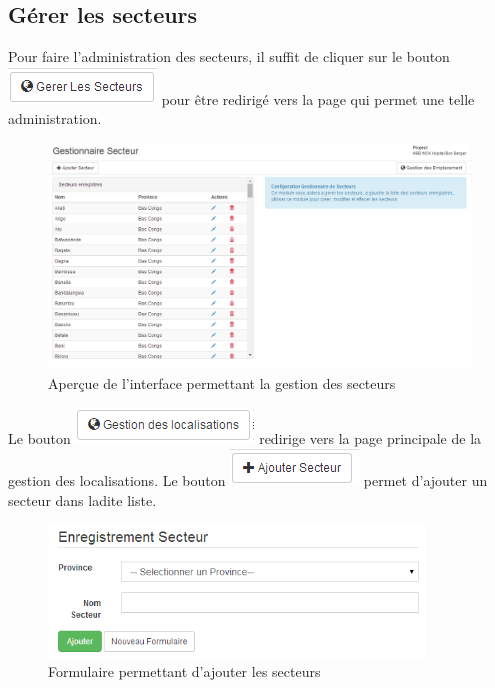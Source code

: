 \documentclass[12pt,a4paper]{report}
\begin{document}
\subsection{Gérer les secteurs}
Pour faire l'administration des secteurs, il suffit de cliquer sur le bouton \includegraphics[scale=0.7]{pic/AdminSecteur.png} pour être redirigé vers la page qui permet une telle administration.

\begin{figure}[h]
\begin{center}
\includegraphics[width=12cm]{pic/FormulaireGestionSecteur.png}
\end{center}
\caption{Aperçue de l'interface permettant la gestion des secteurs}
\label{Aperçue de l'interface permettant la gestion des secteurs}
\end{figure}

Le bouton \includegraphics[scale=0.7]{pic/GestionEmplacement.png} redirige vers la page principale de la gestion des localisations.
Le bouton \includegraphics[scale=0.7]{pic/AddSecteur.png} permet d'ajouter un secteur dans ladite liste.

\begin{figure}[h]
\begin{center}
\includegraphics[width=10cm]{pic/FormAddSecteur.png}
\end{center}
\caption{Formulaire permettant d'ajouter les secteurs}
\label{Formulaire permettant d'ajouter les secteurs}
\end{figure}
\end{document}
